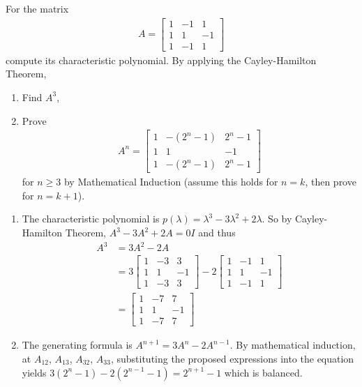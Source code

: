 \begin{Exercise}
For the matrix 
\begin{align*}
A = 
\begin{bmatrix}
1 & -1 & 1\\
1 & 1 & -1\\
1 & -1 & 1
\end{bmatrix}
\end{align*}
compute its characteristic polynomial. By applying the Cayley-Hamilton Theorem,
\begin{enumerate}[label=(\alph*)]
\item Find $A^{3}$,
\item Prove 
\begin{align*}
A^{n} = \begin{bmatrix}
1 & -(2^n-1) & 2^n-1\\
1 & 1 & -1\\
1 & -(2^n-1) & 2^n-1
\end{bmatrix}
\end{align*}
for $n \geq 3$ by Mathematical Induction (assume this holds for $n = k$, then prove for $n = k+1$).
\end{enumerate}
\end{Exercise}
\begin{Answer}
\begin{enumerate}[label=(\alph*)]
\item The characteristic polynomial is $p(\lambda) = \lambda^3-3\lambda^2+2\lambda$. So by Cayley-Hamilton Theorem, $A^3 - 3A^2 + 2A = 0I$ and thus
\begin{align*}
A^3 &= 3A^2 - 2A \\
&= 3\begin{bmatrix}
1&-3&3\\
1&1&-1\\ 
1&-3&3
\end{bmatrix}
- 2\begin{bmatrix}
1 & -1 & 1\\
1 & 1 & -1\\
1 & -1 & 1
\end{bmatrix} \\
&= 
\begin{bmatrix}
1 & -7 & 7\\
1 & 1 & -1\\
1 & -7 & 7
\end{bmatrix}
\end{align*}
\item The generating formula is $A^{n+1} = 3A^n - 2A^{n-1}$. By mathematical induction, at $A_{12}$, $A_{13}$, $A_{32}$, $A_{33}$, substituting the proposed expressions into the equation yields $3(2^{n}-1) - 2(2^{n-1}-1) = 2^{n+1}-1$ which is balanced.
\end{enumerate}
\end{Answer}

